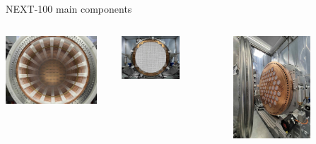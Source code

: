 \documentclass [aspectratio=169]{beamer}
\begin{document}
\begin{frame}{NEXT-100 main components}
\begin{columns}

\includegraphics[width=0.90\textwidth]{n100-tpc.jpeg}

\vspace*{5mm}



\includegraphics[width=0.60\textwidth]{n100-tp.jpeg}

\includegraphics[width=0.60\textwidth]{n100-pmt.jpeg}


\end{columns}
\end{frame}
\end{document}
